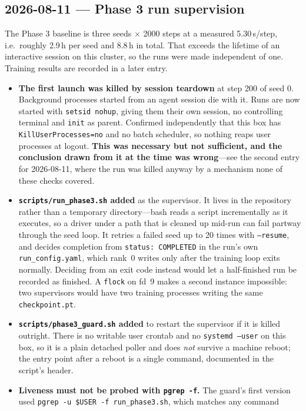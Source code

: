 \documentclass[11pt,a4paper]{article}
\newcommand{\code}[1]{\texttt{\small #1}}
\newcommand{\warn}[1]{\textcolor{warncol}{\textbf{#1}}}
\begin{document}
\subsection*{2026-08-11 --- Phase 3 run supervision}

The Phase 3 baseline is three seeds $\times$ 2000 steps at a measured
5.30\,s/step, i.e.\ roughly 2.9\,h per seed and 8.8\,h in total. That exceeds
the lifetime of an interactive session on this cluster, so the runs were made
independent of one. Training results are recorded in a later entry.

\begin{itemize}
\item \warn{The first launch was killed by session teardown} at step 200 of
seed 0. Background processes started from an agent session die with it. Runs
are now started with \code{setsid nohup}, giving them their own session, no
controlling terminal and \code{init} as parent. Confirmed independently that
this box has \code{KillUserProcesses=no} and no batch scheduler, so nothing
reaps user processes at logout. \warn{This was necessary but not sufficient, and
the conclusion drawn from it at the time was wrong}---see the second entry for
2026-08-11, where the run was killed anyway by a mechanism none of these checks
covered.
\item \textbf{\code{scripts/run\_phase3.sh} added} as the supervisor. It lives
in the repository rather than a temporary directory---bash reads a script
incrementally as it executes, so a driver under a path that is cleaned up mid-run
can fail partway through the seed loop. It retries a failed seed up to 20 times
with \code{--resume}, and decides completion from \code{status: COMPLETED} in
the run's own \code{run\_config.yaml}, which rank~0 writes only after the
training loop exits normally. Deciding from an exit code instead would let a
half-finished run be recorded as finished. A \code{flock} on fd~9 makes a second
instance impossible: two supervisors would have two training processes writing
the same \code{checkpoint.pt}.
\item \textbf{\code{scripts/phase3\_guard.sh} added} to restart the supervisor
if it is killed outright. There is no writable user crontab and no
\code{systemd --user} on this box, so it is a plain detached poller and does
\emph{not} survive a machine reboot; the entry point after a reboot is a single
command, documented in the script's header.
\item \warn{Liveness must not be probed with \code{pgrep -f}.} The guard's first
version used \code{pgrep -u \$USER -f run\_phase3.sh}, which matches any command

\end{itemize}
\end{document}
